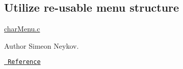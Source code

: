 \subsection*{Utilize re-\/usable menu structure}

\mbox{\hyperlink{char_menu_8c}{char\+Menu.\+c}}

\begin{DoxyAuthor}{Author}
Simeon Neykov.
\end{DoxyAuthor}
\href{https://www.youtube.com/watch?v=PFzNBtnfJ6Y&list=PLfGDzGG5F5eYNBkXs0tTdXqLB3KE5CFgx}{\texttt{ Reference}} 